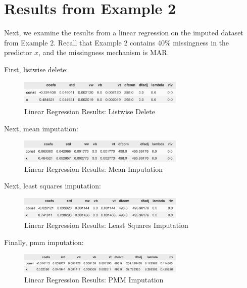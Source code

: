 \documentclass[12pt,oneside]{chicagocapstone}
\begin{document}
\section*{Results from Example 2}\label{results-from-example-2}

Next, we examine the results from a linear regression on the imputed
dataset from Example 2. Recall that Example 2 contains 40\% missingness
in the predictor \(x\), and the missingness mechanism is MAR.

First, listwise delete:
\begin{figure}

{\centering \includegraphics[width=300px]{figure/mar-listwise-delete} 

}

\caption{Linear Regression Results: Listwise Delete}\label{fig:mar-listwise-delete}
\end{figure}
Next, mean imputation:
\begin{figure}

{\centering \includegraphics[width=300px]{figure/mar-mean} 

}

\caption{Linear Regression Results: Mean Imputation}\label{fig:mar-mean}
\end{figure}
Next, least squares imputation:
\begin{figure}

{\centering \includegraphics[width=300px]{figure/mar-ls} 

}

\caption{Linear Regression Results: Least Squares Imputation}\label{fig:mar-ls}
\end{figure}
Finally, pmm imputation:
\begin{figure}

{\centering \includegraphics[width=300px]{figure/mar-pmm} 

}

\caption{Linear Regression Results: PMM Imputation}\label{fig:mar-pmm}
\end{figure}
\end{document}
